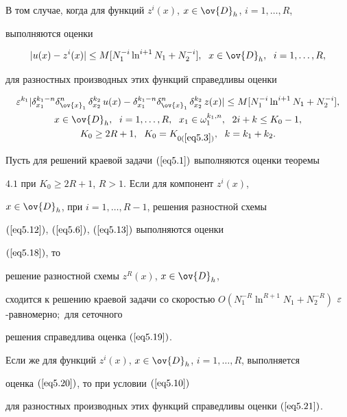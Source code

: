 В том случае, когда для функций $z^i(x)$, $x\in\ov{D}_h$, $i=1,\dotsc,R$,


выполняются оценки


\begin{equation}


\label{eq5.20}


|u(x)-z^i(x)| \le M[N_1^{-i}\ln^{i+1} N_1+N_2^{-i}],


\ \; x\in\ov{D}_h,\ \; i=1,\dotsc,R,


\end{equation}


для разностных производных этих функций справедливы оценки


\begin{gather}


\label{eq5.21}


\eps^{k_1}|\delta_{x_1}^{k_1-n}\delta_{\ov{x}_1}^n\,\delta^{k_2}_{x_2}\,u(x)-


\delta_{x_1}^{k_1-n}\delta^n_{\ov{x}_1}\,\delta^{k_2}_{x_2}\,z(x)|\le


M[N_1^{-i}\ln^{i+1} N_1+N_2^{-i}], \\


x\in\ov{D}_h,\ \; i=1,\dotsc,R,\ \; x_1\in\omega_1^{k_1,n},


\ \; 2i+k\le K_0-1, \notag\\


K_0\ge 2R+1,\ \; K_0=K_{0(\ref{eq5.3})},\ \; k=k_1+k_2. \notag


\end{gather}





\begin{thms}


Пусть для решений краевой задачи $(\ref{eq5.1})$ выполняются оценки теоремы


$4.1$ при $K_0\ge 2R+1$, $R>1$. Если для компонент $z^i(x)$,


$x\in\ov{D}_h$, при $i=1,\dotsc,R-1$, решения разностной схемы


$(\ref{eq5.12})$, $(\ref{eq5.6})$, $(\ref{eq5.13})$ выполняются оценки


$(\ref{eq5.18})$, то


решение разностной схемы $z^R(x)$, $x\in\ov{D}_h$,


сходится к решению краевой задачи со скоростью $O(N_1^{-R}\ln^{R+1}N_1


+N_2^{-R})$ $\eps$-равномерно$;$ для сеточного


решения справедлива оценка $(\ref{eq5.19})$.


Если же для функций $z^i(x)$, $x\in\ov{D}_h$, $i=1,\dotsc,R$, выполняется


оценка $(\ref{eq5.20})$, то при условии $(\ref{eq5.10})$


для разностных производных этих функций справедливы оценки $(\ref{eq5.21})$.


\end{thms}





